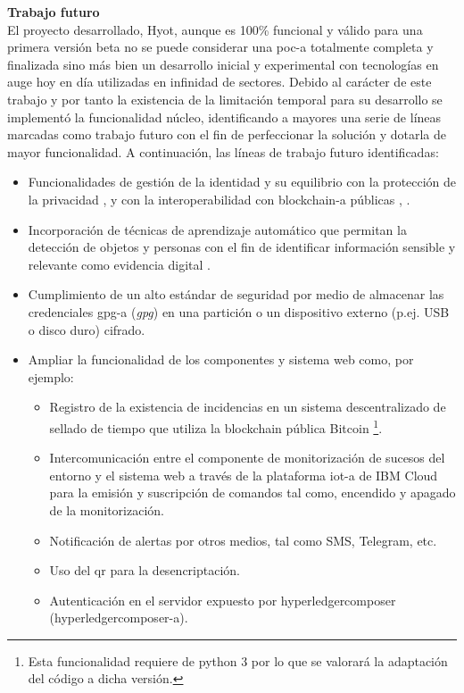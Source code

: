 \documentclass[12pt,a4paper, twoside]{report}
\begin{document}
	{\Large\textbf{Trabajo futuro}} \\
	
	El proyecto desarrollado, Hyot, aunque es 100\% funcional y válido para una primera versión beta no se puede considerar una \gls{poc-a} totalmente completa y finalizada sino más bien un desarrollo inicial y experimental con tecnologías en auge hoy en día utilizadas en infinidad de sectores. Debido al carácter de este trabajo y por tanto la existencia de la limitación temporal para su desarrollo se implementó la funcionalidad núcleo, identificando a mayores una serie de líneas marcadas como trabajo futuro con el fin de perfeccionar la solución y dotarla de mayor funcionalidad. A continuación, las líneas de trabajo futuro identificadas:
	
	\begin{itemize}
		\item Funcionalidades de gestión de la identidad y su equilibrio con la protección de la privacidad \cite{identitymixer}, \cite{jira:IM:FAB-2005} y con la interoperabilidad con \gls{blockchain-a} públicas \cite{hyperledgersawtooth:url}, \cite{ronghua:2018:BCAC}.
		\item Incorporación de técnicas de aprendizaje automático que permitan la detección de objetos y personas con el fin de identificar información sensible y relevante como evidencia digital \cite{ramachandran:2018:SP}.
		\item Cumplimiento de un alto estándar de seguridad por medio de almacenar las credenciales \gls{gpg-a} (\textit{\gls{gpg}}) en una partición o un dispositivo externo (p.ej. USB o disco duro) cifrado.
		\item Ampliar la funcionalidad de los componentes y sistema web como, por ejemplo: 
		
			\begin{itemize}
				\item Registro de la existencia de incidencias en un sistema descentralizado de sellado de tiempo que utiliza la \Gls{blockchain} pública Bitcoin \cite{opentimestamps}\footnote{Esta funcionalidad requiere de \gls{python} 3 por lo que se valorará la adaptación del código a dicha versión.}.
				\item Intercomunicación entre el componente de monitorización de sucesos del entorno y el sistema web a través de la plataforma \gls{iot-a} de IBM Cloud para la emisión y suscripción de comandos tal como, encendido y apagado de la monitorización.
				\item Notificación de alertas por otros medios, tal como SMS, Telegram, etc.
				\item Uso del \gls{qr} para la desencriptación.
				\item Autenticación en el servidor expuesto por \gls{hyperledgercomposer} (\gls{hyperledgercomposer-a}).
			\end{itemize}
	\end{itemize} 
			
\end{document}

